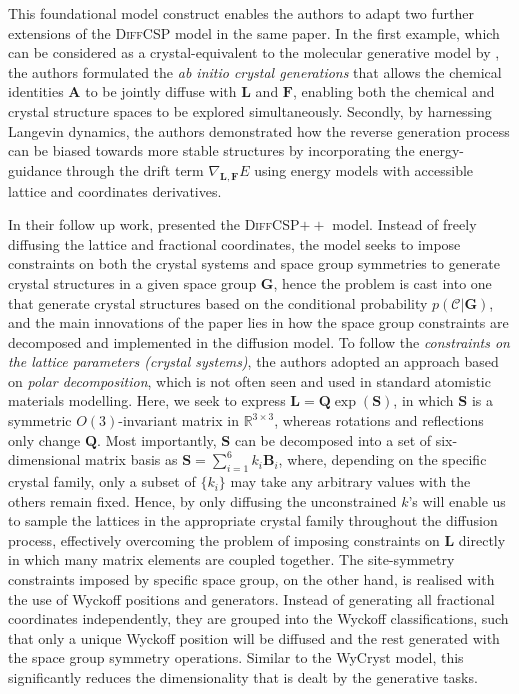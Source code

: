 This foundational model construct enables the authors to adapt two further extensions of the \textsc{DiffCSP} model in the same paper.\cite{jiao2023crystal} In the first example, which can be considered as a crystal-equivalent to the molecular generative model by \citet{hoogeboom2022equivariant}, the authors formulated the \emph{ab initio crystal generations} that allows the chemical identities $\bm{A}$ to be jointly diffuse with $\bm{L}$ and $\bm{F}$, enabling both the chemical and crystal structure spaces to be explored simultaneously. Secondly, by harnessing  Langevin dynamics, the authors demonstrated how the reverse generation process can be biased towards more stable structures by incorporating the energy-guidance through the drift term $\nabla_{\bm{L},\bm{F}}E$ using energy models with accessible lattice and coordinates derivatives.

In their follow up work, \citet{jiao2024space} presented the \textsc{DiffCSP}$++$ model. Instead of freely diffusing the lattice and fractional coordinates, the model seeks to impose constraints on both the crystal systems and space group symmetries to generate crystal structures in a given space group $\bm{G}$, hence the problem is cast into one that generate crystal structures based on the conditional probability $p(\mathcal{C}|\bm{G})$, and the main innovations of the paper lies in how the space group constraints are decomposed and implemented in the diffusion model. To follow the \textit{constraints on the lattice parameters (crystal systems)}, the authors adopted an approach based on \emph{polar decomposition}, which is not often seen and used in standard atomistic materials modelling. Here, we seek to express $\bm{L}=\bm{Q}\exp(\bm{S})$, in which $\bm{S}$ is a symmetric $O(3)$-invariant matrix in $\mathbb{R}^{3\times3}$, whereas rotations and reflections only change $\bm{Q}$. Most importantly, $\bm{S}$ can be decomposed into a set of six-dimensional matrix basis as $\bm{S}=\sum_{i=1}^6 k_i\bm{B}_i$, where, depending on the specific crystal family, only a subset of $\{k_i\}$ may take any arbitrary values with the others remain fixed. Hence, by only diffusing the unconstrained $k$'s will enable us to sample the lattices in the appropriate crystal family throughout the diffusion process, effectively overcoming the problem of imposing constraints on $\bm{L}$ directly in which many matrix elements are coupled together. The site-symmetry constraints imposed by specific space group, on the other hand, is realised with the use of Wyckoff positions and generators. Instead of generating all fractional coordinates independently, they are grouped into the Wyckoff classifications, such that only a unique Wyckoff position will be diffused and the rest generated with the space group symmetry operations. 
Similar to the WyCryst model,\cite{zhu2024wycryst} this significantly reduces the dimensionality that is dealt by the generative tasks.

